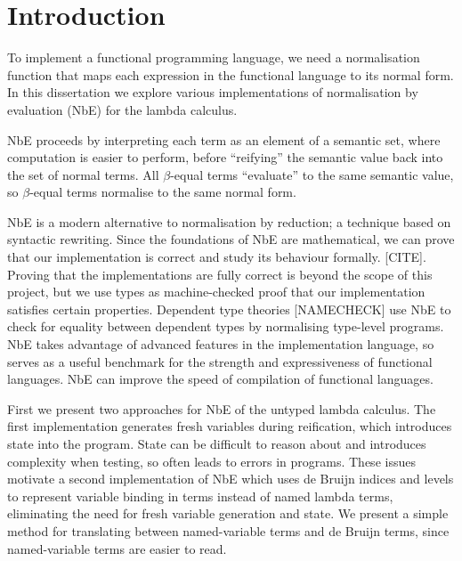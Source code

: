 \chapter{Introduction}
\label{chap:introduction}

To implement a functional programming language, we need a normalisation function that maps each expression in the functional language to its normal form.
In this dissertation we explore various implementations of normalisation by evaluation (NbE) for the lambda calculus.

NbE proceeds by interpreting each term as an element of a semantic set, where computation is easier to perform, before “reifying” the semantic value back into the set of normal terms. All $\beta$-equal terms “evaluate” to the same semantic value, so $\beta$-equal terms normalise to the same normal form.

NbE is a modern alternative to normalisation by reduction; a technique based on syntactic rewriting. Since the foundations of NbE are mathematical, we can prove that our implementation is correct and study its behaviour formally. [CITE]. Proving that the implementations are fully correct is beyond the scope of this project, but we use types as machine-checked proof that our implementation satisfies certain properties.
Dependent type theories [NAMECHECK] use NbE to check for equality between dependent types by normalising type-level programs.
NbE takes advantage of advanced features in the implementation language, so serves as a useful benchmark for the strength and expressiveness of functional languages.
NbE can improve the speed of compilation of functional languages. \cite{efficientNbE}

First we present two approaches for NbE of the untyped lambda calculus. The first implementation generates fresh variables during reification, which introduces state into the program. State can be difficult to reason about and introduces complexity when testing, so often leads to errors in programs. These issues motivate a second implementation of NbE which uses de Bruijn indices and levels to represent variable binding in terms instead of named lambda terms, eliminating the need for fresh variable generation and state. We present a simple method for translating between named-variable terms and de Bruijn terms, since named-variable terms are easier to read. 


